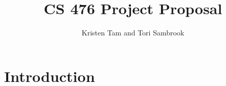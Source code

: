 \documentclass{article}
\title{CS 476 Project Proposal}
\author{Kristen Tam and Tori Sambrook}
\begin{document}
\maketitle

\section*{Introduction}
\end{document}
